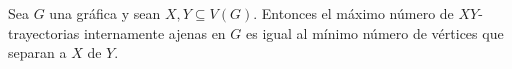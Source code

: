 

\begin{teorema}
    \label{teo:menger}
    Sea $G$ una gr\'afica y sean $X, Y \subseteq V(G)$. Entonces el m\'aximo
    n\'umero de $XY$-trayectorias internamente ajenas en $G$ es igual al
    m\'inimo n\'umero de v\'ertices que separan a $X$ de $Y$.
\end{teorema}

